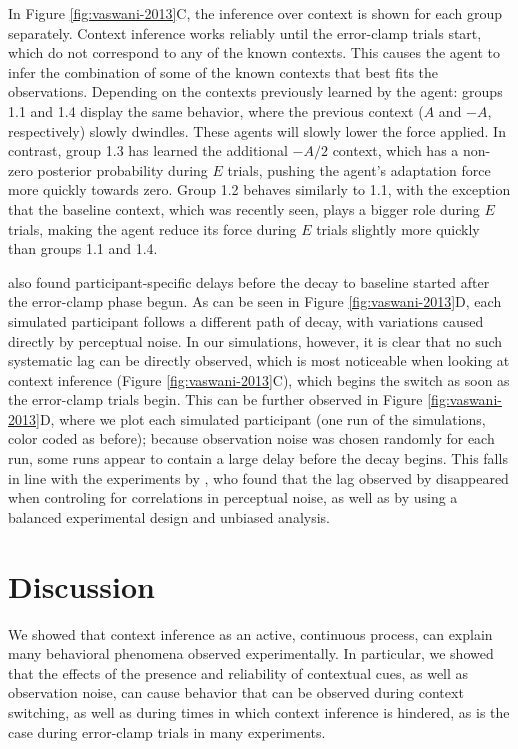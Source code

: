 \documentclass[a4paper,doc,floatsintext,natbib]{apa6}
\def \fref #1{Figure \ref{#1}}     %
\begin{document}
In \fref{fig:vaswani-2013}C, the inference over context is shown for each group separately. Context inference works reliably until the error-clamp trials start, which do not correspond to any of the known contexts. This causes the agent to infer the combination of some of the known contexts that best fits the observations. Depending on the contexts previously learned by the agent: groups 1.1 and 1.4 display the same behavior, where the previous context ($A$ and $-A$, respectively) slowly dwindles. These agents will slowly lower the force applied. In contrast, group 1.3 has learned the additional $-A/2$ context, which has a non-zero posterior probability during $E$ trials, pushing the agent's adaptation force more quickly towards zero. Group 1.2 behaves similarly to 1.1, with the exception that the baseline context, which was recently seen, plays a bigger role during $E$ trials, making the agent reduce its force during $E$ trials slightly more quickly than groups 1.1 and 1.4.

\cite{Vaswani_Decay_2013} also found participant-specific delays before the decay to baseline started after the error-clamp phase begun. As can be seen in \fref{fig:vaswani-2013}D, each simulated participant follows a different path of decay, with variations caused directly by perceptual noise. In our simulations, however, it is clear that no such systematic lag can be directly observed, which is most noticeable when looking at context inference (\fref{fig:vaswani-2013}C), which begins the switch as soon as the error-clamp trials begin. This can be further observed in \fref{fig:vaswani-2013}D, where we plot each simulated participant (one run of the simulations, color coded as before); because observation noise was chosen randomly for each run, some runs appear to contain a large delay before the decay begins. This falls in line with the experiments by \cite{Brennan_Decay_2015}, who found that the lag observed by \cite{Vaswani_Decay_2013} disappeared when controling for correlations in perceptual noise, as well as by using a balanced experimental design and unbiased analysis.


\section{Discussion}
We showed that context inference as an active, continuous process, can explain many behavioral phenomena observed experimentally. In particular, we showed that the effects of the presence and reliability of contextual cues, as well as observation noise, can cause behavior that can be observed during context switching, as well as during times in which context inference is hindered, as is the case during error-clamp trials in many experiments.
\end{document}
